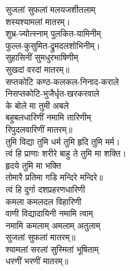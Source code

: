 
\clearpage
{}
\vspace{-0.3cm}
सुजलां सुफलां मलयजशीतलाम्\\
शस्यश्यामलां मातरम्।\\
शुभ्र-ज्योत्स्नाम् पुलकित-यामिनीम्\\
फुल्ल-कुसुमित-द्रुमदलशोभिनीम्।\\
सुहासिनीं सुमधुरभाषिणीम्\\
सुखदां वरदां मातरम्॥\\
सप्तकोटि कण्ठ-कलकल-निनाद-कराले\\
निसप्तकोटि-भुजैर्धृत-खरकरवाले\\
के बोले मा तुमी अबले\\
बहुबलधारिणीं नमामि तारिणीम्\\
रिपुदलवारिणीं मातरम्॥\\
तुमि विद्या तुमि धर्म तुमि हृदि तुमि मर्म।\\
त्वं हि प्राणाः शरीरे बाहु ते तुमि मा शक्ति।\\
हृदये तुमि मा भक्ति\\
तोमारै प्रतिमा गडि मन्दिरे मन्दिरे॥\\
त्वं हि दुर्गा दशप्रहरणधारिणी\\
कमला कमलदल विहारिणी\\
वाणी विद्यादायिनी नमामि त्वाम्\\
नमामि कमलाम् अमलाम् अतुलाम्\\
सुजलां सुफलां मातरम्॥\\
श्यामलां सरलां सुस्मितां भूषिताम्\\
धरणीं भरणीं मातरम्॥\\
